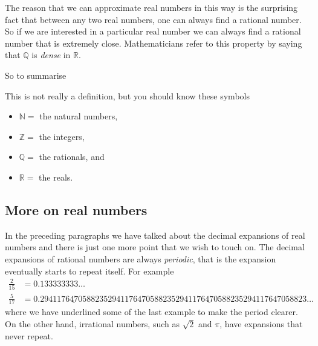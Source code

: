 \begin{itemize}
The reason that we can approximate real numbers in this way is the
surprising fact that between any two real numbers, one can always find a
rational number. So if we are interested in a particular real number we can
always find a rational number that is extremely close. Mathematicians refer
to this property by saying that $\mathbb{Q}$ is \emph{dense} in $\mathbb{R}$.
\end{itemize}
So to summarise
\begin{defn}
  This is not really a definition, but you should know these symbols
 \begin{itemize}
  \item $\mathbb{N} = $ the natural numbers,
  \item $\mathbb{Z} = $ the integers,
  \item $\mathbb{Q} = $ the rationals, and
  \item $\mathbb{R} = $ the reals.
 \end{itemize}

\end{defn}



\subsection*{More on real numbers}
In the preceding paragraphs we have talked about the decimal expansions of real
numbers and there is just one more point that we wish to touch on. The decimal
expansions of rational numbers are always \emph{periodic}, that is the expansion
eventually starts to repeat itself. For example
\begin{align*}
  \frac{2}{15} &= 0.133333333\dots \\
  \frac{5}{17} &=
0.\underline{
2941176470588235}2941176470588235\underline{2941176470588235}
294117647058823\dots
\end{align*}
where we have underlined some of the last example to make the period clearer.
On the other hand, irrational numbers, such as $\sqrt{2}$ and $\pi$, have
expansions that never repeat.

